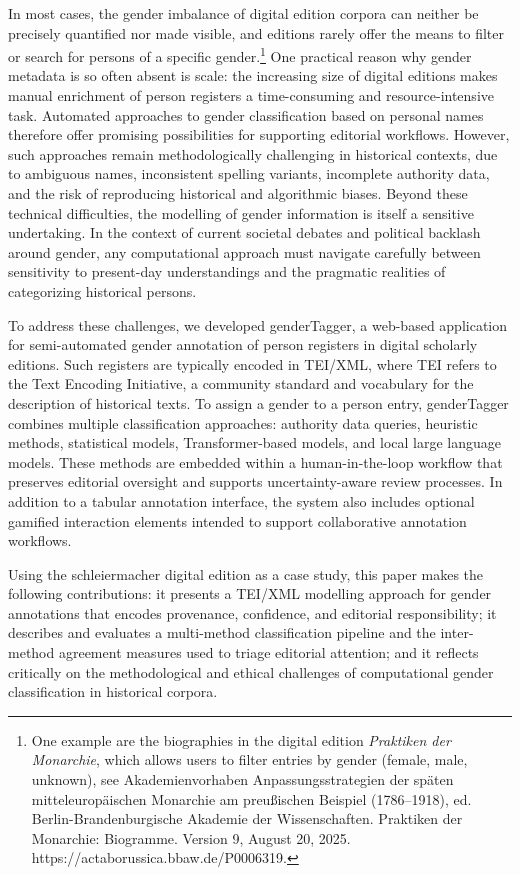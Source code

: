 \documentclass{eceasst}
\begin{document}
In most cases, the gender imbalance of digital edition corpora can neither be precisely quantified nor made visible, and editions rarely offer the means to filter or search for persons of a specific gender.\footnote{One example are the biographies in the digital edition \textit{Praktiken der Monarchie}, which allows users to filter entries by gender (female, male, unknown), see Akademienvorhaben Anpassungsstrategien der späten mitteleuropäischen Monarchie am preußischen Beispiel (1786–1918), ed. Berlin-Brandenburgische Akademie der Wissenschaften. Praktiken der Monarchie: Biogramme. Version 9, August 20, 2025. https://actaborussica.bbaw.de/P0006319.} One practical reason why gender metadata is so often absent is scale: the increasing size of digital editions makes manual enrichment of person registers a time-consuming and resource-intensive task. Automated approaches to gender classification based on personal names therefore offer promising possibilities for supporting editorial workflows. However, such approaches remain methodologically challenging in historical contexts, due to ambiguous names, inconsistent spelling variants, incomplete authority data, and the risk of reproducing historical and algorithmic biases. Beyond these technical difficulties, the modelling of gender information is itself a sensitive undertaking. In the context of current societal debates and political backlash around gender, any computational approach must navigate carefully between sensitivity to present-day understandings and the pragmatic realities of categorizing historical persons. 

To address these challenges, we developed genderTagger, a web-based application for semi-automated gender annotation of person registers in digital scholarly editions. Such registers are typically encoded in TEI/XML, where TEI refers to the Text Encoding Initiative, a community standard and vocabulary for the description of historical texts. To assign a gender to a person entry, genderTagger combines multiple classification approaches: authority data queries, heuristic methods, statistical models, Transformer-based models, and local large language models. These methods are embedded within a human-in-the-loop workflow that preserves editorial oversight and supports uncertainty-aware review processes. In addition to a tabular annotation interface, the system also includes optional gamified interaction elements intended to support collaborative annotation workflows.

Using the schleiermacher digital edition\cite{schleiermacher-digital} as a case study, this paper makes the following contributions: it presents a TEI/XML modelling approach for gender annotations that encodes provenance, confidence, and editorial responsibility; it describes and evaluates a multi-method classification pipeline and the inter-method agreement measures used to triage editorial attention; and it reflects critically on the methodological and ethical challenges of computational gender classification in historical corpora.
\end{document}
